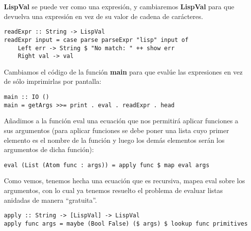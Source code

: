 \textbf{LispVal} se puede ver como una expresi\'on, y cambiaremos \textbf{LispVal} para que devuelva una expresi\'on en vez de su valor de cadena de car\'acteres.\\

\begin{minipage}{\linewidth}
\begin{small}
\begin{lstlisting}[frame=single]
readExpr :: String -> LispVal
readExpr input = case parse parseExpr "lisp" input of
    Left err -> String $ "No match: " ++ show err
    Right val -> val
\end{lstlisting}
\end{small}
\end{minipage}

Cambiamos el c\'odigo de la funci\'on \textbf{main} para que eval\'ue las expresiones en vez de s\'olo imprimirlas por pantalla:\\

\begin{minipage}{\linewidth}
\begin{small}
\begin{lstlisting}[frame=single]
main :: IO ()
main = getArgs >>= print . eval . readExpr . head
\end{lstlisting}
\end{small}
\end{minipage}

A\~nadimos a la funci\'on eval una ecuaci\'on que nos permitir\'a aplicar funciones a sus argumentos (para aplicar funciones se debe poner una lista cuyo primer elemento es el nombre de la funci\'on y luego los dem\'as elementos ser\'an los argumentos de dicha funci\'on):\\

\begin{minipage}{\linewidth}
\begin{small}
\begin{lstlisting}[frame=single]
eval (List (Atom func : args)) = apply func $ map eval args
\end{lstlisting}
\end{small}
\end{minipage}

Como vemos, tenemos hecha una ecuaci\'on que es recursiva, mapea eval sobre los argumentos, con lo cual ya tenemos resuelto el problema de evaluar listas anidadas de manera ``gratuita''.\\

\begin{minipage}{\linewidth}
\begin{small}
\begin{lstlisting}[frame=single]
apply :: String -> [LispVal] -> LispVal
apply func args = maybe (Bool False) ($ args) $ lookup func primitives
\end{lstlisting}
\end{small}
\end{minipage}

